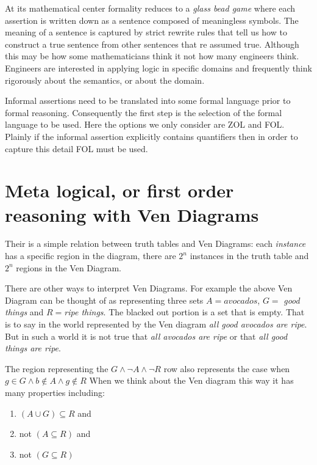 At its mathematical center formality reduces to a \emph{glass bead game} where each assertion is written down as a sentence composed of meaningless symbols. The meaning of a sentence is captured by strict rewrite rules that tell us how to construct a true sentence from other sentences that re assumed true. Although this may be how some mathematicians think it not how many engineers think. Engineers are interested in applying logic in specific domains and frequently think rigorously about the semantics, or about the domain.
\newpage

Informal assertions need to be translated into some formal language prior to formal reasoning. Consequently the first step is the selection of the formal language  to be used. Here the options we only consider are ZOL and FOL. Plainly if the informal assertion explicitly contains quantifiers then in order to capture this detail FOL must be used.


\section{Meta logical, or first order reasoning with Ven Diagrams}

Their is a simple relation between truth tables and Ven Diagrams:  each \emph{instance} has a specific region in the diagram, there are $2^n$ instances in the truth table and $2^n$ regions in the Ven Diagram. 

There are other ways to interpret Ven Diagrams. For example the above Ven Diagram can be thought of as representing three sets $A=avocados $, 
$G=$\emph{ good things} and $R=$\emph{ripe things}.  The blacked out portion is a set that is  empty.  That is to say in the world represented by the Ven diagram   \emph{all good avocados are ripe}. But in such a world it is not true that \emph{all avocados are ripe} or that \emph{all good things are ripe}.


The region representing the $G\wedge\neg A \wedge \neg R$ row also represents the  case when $g\in G \wedge b\not\in A \wedge g\not\in R$ When we think about the Ven diagram this way it has many properties including: 
\begin{enumerate}
\item  $(A\cup G) \subseteq R$ and 
\item  not $(A \subseteq R)$ and
\item  not $(G \subseteq R)$
\end{enumerate}


